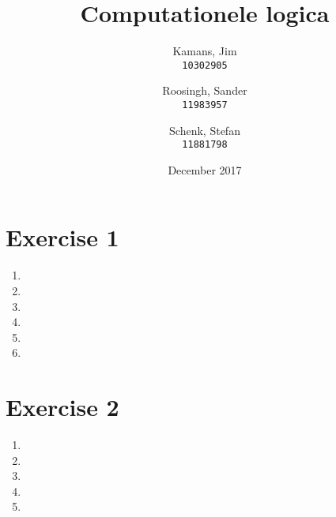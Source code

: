 \documentclass[leqno]{article}
\title{Computationele logica}
\author{
    Kamans, Jim\\
    \texttt{10302905}
    \and
    Roosingh, Sander\\
    \texttt{11983957}
    \and
    Schenk, Stefan\\
    \texttt{11881798}
}
\date{December 2017}
\begin{document}
\maketitle

\section*{Exercise 1}

\begin{enumerate}
	\item 
	\item 
	\item 
	\item 
	\item 
	\item 
\end{enumerate}

\section*{Exercise 2}

\begin{enumerate}
	\item 
	\item 
	\item 
	\item 
	\item 
\end{enumerate}
\end{document}
